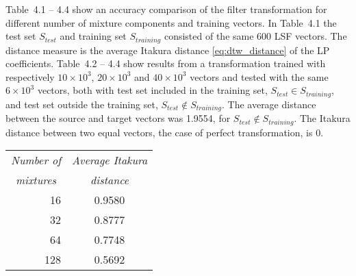 \clearpage
Table~4.1 -- 4.4 show an accuracy comparison of the filter transformation for different number of mixture components and training vectors. In Table~4.1 the test set $S_{test}$ and training set $S_{training}$ consisted of the same 600 LSF vectors. The distance measure is the average Itakura distance \eqref{eq:dtw_distance} of the LP coefficients. Table~4.2 -- 4.4 show results from a transformation trained with respectively $10\times 10^3$, $20\times 10^3$ and $40\times 10^3$ vectors and tested with the same $6\times 10^3$ vectors, both with test set included in the training set, $S_{test} \in S_{training}$, and test set outside the training set, $S_{test} \notin S_{training}$. The average distance between the source and target vectors was 1.9554, for $S_{test} \notin S_{training}$. The Itakura distance between two equal vectors, \ie the case of perfect transformation, is 0.

\begin{table}[htbp]
	\begin{center}
		\begin{tabular}{r|c}
			\toprule
			\multicolumn{1}{c}{\emph{Number of}} & \multicolumn{1}{c}{\emph{Average Itakura}} \\
\multicolumn{1}{c}{\emph{mixtures}} &  \multicolumn{1}{c}{\emph{distance}} \\
			\midrule
			16 & 0.9580 \\
			32 & 0.8777 \\
			64 & 0.7748 \\
			128 & 0.5692 \\
			\bottomrule			
		\end{tabular}		
	\end{center}
	\label{tab:accuracy_comparison_equal}	
\end{table}



